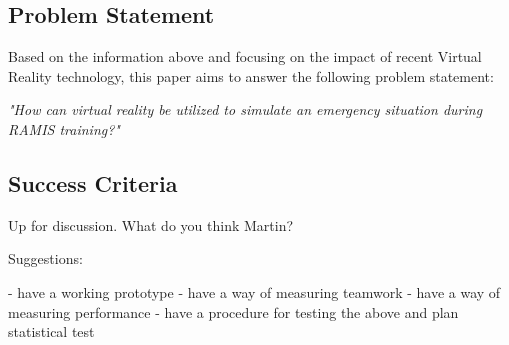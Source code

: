 \documentclass[paper=a4, fontsize=11pt]{scrartcl} %
\numberwithin{equation}{section} %
\numberwithin{figure}{section} %
\numberwithin{table}{section} %
\begin{document}

\subsection{Problem Statement}

Based on the information above and focusing on the impact of recent Virtual Reality technology, this paper aims to answer the following problem statement:\\

\begin{center}
\emph{\textit{"How can virtual reality be utilized to simulate an emergency situation during RAMIS training?"}}
\end{center}


\subsection{Success Criteria}

Up for discussion. What do you think Martin? 

Suggestions: 

- have a working prototype
- have a way of measuring teamwork
- have a way of measuring performance
- have a procedure for testing the above and plan statistical test

\end{document}
